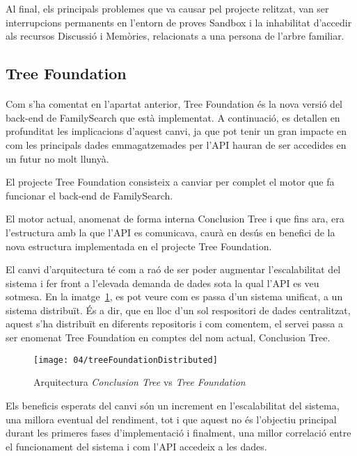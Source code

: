     Al final, els principals problemes que va causar pel projecte relitzat, van ser interrupcions permanents en l'entorn de proves Sandbox i la inhabilitat d’accedir als recursos Discussió i Memòries, relacionats a una persona de l'arbre familiar.


    \subsection{Tree Foundation}

    \paragraph{}
    Com s'ha comentat en l'apartat anterior, Tree Foundation és la nova versió del back-end de FamilySearch que està implementat. A continuació, es detallen en profunditat les implicacions d'aquest canvi, ja que pot tenir un gran impacte en com les principals dades emmagatzemades per l'API hauran de ser accedides en un futur no molt llunyà.

    El projecte Tree Foundation consisteix a canviar per complet el motor que fa funcionar el back-end de FamilySearch.

    El motor actual, anomenat de forma interna Conclusion Tree i que fins ara, era l’estructura amb la que l'API es comunicava, caurà en desús en benefici de la nova estructura implementada en el projecte Tree Foundation.

    El canvi d’arquitectura té com a raó de ser poder augmentar l’escalabilitat del sistema i fer front a l'elevada demanda de dades sota la qual l'API es veu sotmesa. En la imatge~\ref{fig:architecture}, es pot veure com es passa d’un sistema unificat, a un sistema distribuït. És a dir, que en lloc d'un sol respositori de dades centralitzat, aquest s'ha distribuït en diferents repositoris i com comentem, el servei passa a ser enomenat Tree Foundation en comptes del nom actual, Conclusion Tree.

    \begin{figure}[h]
        \texttt{[image: 04/treeFoundationDistributed]}
        \centering
        \caption{Arquitectura \emph{Conclusion Tree} vs \emph{Tree Foundation}\label{fig:architecture}}
    \end{figure}

    Els beneficis esperats del canvi són un increment en l'escalabilitat del sistema, una millora eventual del rendiment, tot i que aquest no és l’objectiu principal durant les primeres fases d’implementació i finalment, una millor correlació entre el funcionament del sistema i com l'API accedeix a les dades.

